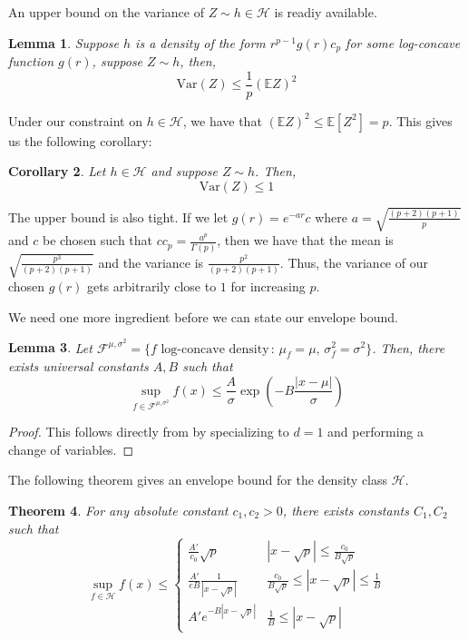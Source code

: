 \documentclass[12pt]{article}
\newtheorem{theorem}{Theorem}
\newtheorem{lemma}[theorem]{Lemma}
\newtheorem{corollary}[theorem]{Corollary}
\begin{document}
An upper bound on the variance of $Z \sim h \in \mathcal{H}$ is readiy available. 

\begin{lemma} \citet[Lemma 1]{bobkov2003spectral}
  \label{Lem:VarUpperBoundGeneral}
Suppose $h$ is a density of the form $r^{p-1} g(r) c_p$ for some log-concave function $g(r)$, suppose $Z \sim h$, then, 
\[
\mathrm{Var}(Z) \leq \frac{1}{p} (\mathbb{E} Z)^2 
\]
\end{lemma}

Under our constraint on $h \in \mathcal{H}$, we have that $(\mathbb{E} Z )^2 \leq \mathbb{E}[ Z^2] = p$. This gives us the following corollary:

\begin{corollary}
\label{Cor:VarUpperBound}
Let $h \in \mathcal{H}$ and suppose $Z \sim h$. Then,
\[
\mathrm{Var}(Z) \leq 1
\]
\end{corollary}

The upper bound is also tight. If we let $g(r) = e^{-a r} c$ where $a = \sqrt{\frac{(p+2)(p+1)}{p}}$ and $c$ be chosen such that $c c_p = \frac{a^p}{\Gamma(p)}$, then we have that the mean is $\sqrt{ \frac{p^3}{(p+2)(p+1)} }$ and the variance is $\frac{p^2}{(p+2)(p+1)}$. Thus, the variance of our chosen $g(r)$ gets arbitrarily close to $1$ for increasing $p$. 

We need one more ingredient before we can state our envelope bound. 

\begin{lemma}
\label{Lem:UnivariateMuSigmaEnvelope}
Let $\mathcal{F}^{\mu, \sigma^2} = \{ f \textrm{ log-concave density} \,:\, \mu_f = \mu,\, \sigma^2_f = \sigma^2 \}$. Then, there exists universal constants $A, B$ such that
\[
\sup_{f \in \mathcal{F}^{\mu, \sigma^2} } f(x) \leq \frac{A}{\sigma} \exp\left( - B \frac{| x - \mu |}{\sigma} \right)
\]
\end{lemma}

\begin{proof}
This follows directly from  \citet[Theorem 2]{kim2016global} by specializing to $d=1$ and performing a change of variables.
\end{proof}

The following theorem gives an envelope bound for the density class $\mathcal{H}$.
\begin{theorem}
For any absolute constant $c_1, c_2 > 0$, there exists constants $C_1, C_2$ such that
\[
\sup_{f \in \mathcal{H}} f(x) \leq 
  \left\{
   \begin{array}{cc} 
   \frac{A'}{c_0} \sqrt{p} & \left| x - \sqrt{p} \right| \leq \frac{c_0}{B \sqrt{p}} \\
   \frac{A'}{eB} \frac{1}{| x - \sqrt{p} |} & \frac{c_0}{B \sqrt{p}} \leq \left| x - \sqrt{p} \right| \leq \frac{1}{B} \\
   A' e^{ - B | x - \sqrt{p} | } & \frac{1}{B} \leq \left| x - \sqrt{p} \right|  
   \end{array} \right.
\]
\end{theorem}
\end{document}
